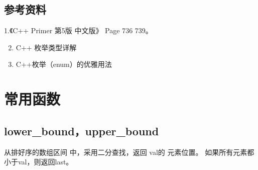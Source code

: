 \documentclass[letterpaper,10pt,english]{sphinxmanual}
\begin{document}
\subsection{参考资料}
\label{\detokenize{cpp/17_enumUnion:id6}}
1.《C++ Primer 第5版 中文版》 Page 736 \textendash{} 739。
\begin{enumerate}
\setcounter{enumi}{1}
\item {} 
C++ 枚举类型详解

\end{enumerate}
\begin{quote}

\end{quote}
\begin{enumerate}
\setcounter{enumi}{2}
\item {} 
C++枚举（enum）的优雅用法

\end{enumerate}
\begin{quote}

\end{quote}


\section{常用函数}
\label{\detokenize{cpp/18_commonFunc::doc}}\label{\detokenize{cpp/18_commonFunc:id1}}

\subsection{lower\_bound，upper\_bound}
\label{\detokenize{cpp/18_commonFunc:lower-bound-upper-bound}}
%
\begin{sphinxVerbatim}[commandchars=\\\{\}]
 
\end{sphinxVerbatim}

 从排好序的数组区间 \sphinxstylestrong{{[}first,last)} 中，采用二分查找，返回  val的  元素位置。
如果所有元素都小于val，则返回last。

%
\begin{sphinxVerbatim}[commandchars=\\\{\}]
    
        
\end{sphinxVerbatim}
\end{document}
